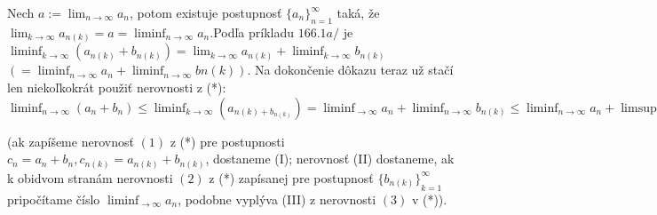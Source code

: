 Nech $a:=\lim_{n \rightarrow \infty} a_n$, potom existuje postupnosť ${\{a_n\}}_{n=1}^\infty$ taká, že $\lim_{k \rightarrow \infty} a_{n(k)}=a=\liminf_{n \rightarrow \infty} a_n$.Podľa príkladu $166.1a/$ je $\liminf_{k \rightarrow \infty} (a_{n(k)}+b_{n(k)})=\lim_{k \rightarrow \infty} a_{n(k)}+\liminf_{k \rightarrow \infty} b_{n(k)}$  $(=\liminf_{n \rightarrow \infty} a_n + \liminf_{n \rightarrow \infty} b{n(k)}).$ Na dokončenie dôkazu teraz už stačí len niekoľkokrát použiť nerovnosti z (*):
$\liminf_{n \rightarrow \infty} (a_n+b_n) \leq \liminf_{k \rightarrow \infty} (a_{n(k)+b_{n(k)}})=\liminf_{\rightarrow \infty} a_n+\liminf_{n \rightarrow \infty} b_{n(k)} \leq \liminf_{n \rightarrow \infty} a_n+\limsup_{k \rightarrow \infty} b_{n(k)}\leq \liminf_{n \rightarrow \infty} a_n+\limsup_{n \rightarrow \infty} b_n$

(ak zapíšeme nerovnosť $(1)$ z (*) pre postupnosti $c_n=a_n+b_n,c_{n(k)}=a_{n(k)}+b_{n(k)}$, dostaneme (I); nerovnosť (II) dostaneme, ak k obidvom stranám nerovnosti $(2)$ z (*) zapísanej pre postupnosť ${\{b_{n(k)}\}}_{k=1}^\infty$ pripočítame číslo $\liminf_{\rightarrow \infty} a_n$, podobne vyplýva (III) z nerovnosti $(3)$ v (*)).

